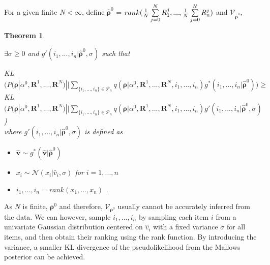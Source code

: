 \documentclass[11pt, oneside]{article}   	%
\newtheorem{theorem}{Theorem}[subsection]
\begin{document}
\subsection{ }
For a given finite $N < \infty$, define $\hat{\bm{\rho}}^0$ = $rank({1\over N}\sum\limits_{j=0}^{N}R_1^j, ..., {1\over N}\sum\limits_{j=0}^{N}R_n^j)$ and  $\mathcal{V}_{\hat{\bm{\rho}}^0}$, 

\begin{theorem} \label{theorem:gaussiannoise}

$\exists\sigma \geq 0$ and $g'(i_1, ..., i_n|{\hat{\bm{\rho}}^0}, \sigma)$ such that 

 KL $\Big(P(\bm{\rho}|\alpha^0, \bm{R}^1, ...,\bm{R}^N ) || \sum\limits_{\{i_1,..., i_n\} \in \mathcal{P}_n} q ({\bm{\rho}}|\alpha^0, \bm{R}^1,..., \bm{R}^N, i_1,...,i_n) g^{*}(i_1,...,i_n|{\hat{\bm{\rho}}^0})\Big)\geq $\\
 KL $\Big(P(\bm{\rho}|\alpha^0, \bm{R}^1, ...,\bm{R}^N ) || \sum\limits_{\{i_1,..., i_n\} \in \mathcal{P}_n} q ({\bm{\rho}}|\alpha^0, \bm{R}^1,..., \bm{R}^N, i_1,...,i_n) g'(i_1,...,i_n|{\hat{\bm{\rho}}^0}, \sigma)$\Big)\\

 where 
 $g'(i_1, ..., i_n|{\hat{\bm{\rho}}^0}, \sigma) $ is defined as 
 \begin{itemize}
 	\item {$\hat{\bm{v}} \sim g^* (\hat{\bm{v}}|{\hat{\bm{\rho}}^{0}})$}
  	\item {$x_i\sim \mathcal{N}(x_i|\hat{v}_i, \sigma)$} for $i = 1,...,n $
 	\item {$i_1, ..., i_n = rank(x_1, ..., x_n)$ }. 
 \end{itemize}
 	
\end{theorem} 
As $N$ is finite, $\bm{\rho}^0$ and therefore, $\mathcal{V}_{\bm{\rho}^0}$ usually cannot be accurately inferred from the data. We can however, sample $i_1, ..., i_n$ by sampling each item $i$ from a univariate Gaussian distribution centered on $\hat{v}_i$ with a fixed variance $\sigma$ for all items, and then obtain their ranking using the rank function. By introducing the variance, a smaller KL divergence of the pseudolikelihood from the Mallows posterior can be achieved.
 
\end{document}
